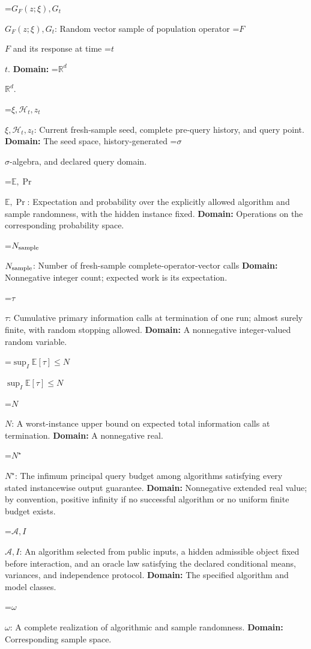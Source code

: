 \documentclass[10pt,a4paper]{article}
\newcommand{\AtlasMath}[1]{\par\begingroup\centering\setbox0=\hbox{$\displaystyle #1$}\ifdim\wd0>1.4\linewidth\typeout{ATLAS WIDE FORMULA: \the\wd0}\fi\ifdim\wd0>\linewidth\resizebox{\linewidth}{!}{\box0}\else\box0\fi\par\endgroup}
\newcommand{\AtlasInlineMath}[1]{\begingroup\setbox0=\hbox{$#1$}\ifdim\wd0>.4\linewidth\endgroup\AtlasMath{#1}\else\endgroup$#1$\fi}
\begin{document}
\AtlasInlineMath{G_F(z;\xi),G_t}: Random vector sample of population operator \AtlasInlineMath{F} and its response at time \AtlasInlineMath{t}. \textbf{Domain:} \AtlasInlineMath{\mathbb R^d}.



\AtlasInlineMath{\xi,\mathcal H_t,z_t}: Current fresh-sample seed, complete pre-query history, and query point. \textbf{Domain:} The seed space, history-generated \AtlasInlineMath{\sigma}-algebra, and declared query domain.



\AtlasInlineMath{\mathbb E,\Pr}: Expectation and probability over the explicitly allowed algorithm and sample randomness, with the hidden instance fixed. \textbf{Domain:} Operations on the corresponding probability space.



\AtlasInlineMath{N_{\rm sample}}: Number of fresh-sample complete-operator-vector calls \textbf{Domain:} Nonnegative integer count; expected work is its expectation.



\AtlasInlineMath{\tau}: Cumulative primary information calls at termination of one run; almost surely finite, with random stopping allowed. \textbf{Domain:} A nonnegative integer-valued random variable.



\AtlasInlineMath{\sup_I\mathbb E[\tau]\le N}



\AtlasInlineMath{N}: A worst-instance upper bound on expected total information calls at termination. \textbf{Domain:} A nonnegative real.



\AtlasInlineMath{N^\star}: The infimum principal query budget among algorithms satisfying every stated instancewise output guarantee. \textbf{Domain:} Nonnegative extended real value; by convention, positive infinity if no successful algorithm or no uniform finite budget exists.



\AtlasInlineMath{\mathcal A,I}: An algorithm selected from public inputs, a hidden admissible object fixed before interaction, and an oracle law satisfying the declared conditional means, variances, and independence protocol. \textbf{Domain:} The specified algorithm and model classes.



\AtlasInlineMath{\omega}: A complete realization of algorithmic and sample randomness. \textbf{Domain:} Corresponding sample space.
\end{document}
